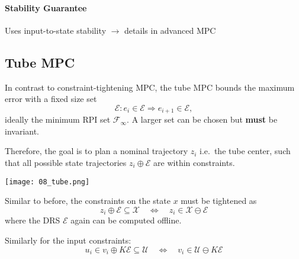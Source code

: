 \paragraph{Stability Guarantee}
Uses input-to-state stability $\rightarrow$ details in advanced MPC

\subsection{Tube MPC}
In contrast to constraint-tightening MPC, the tube MPC bounds the maximum error with a fixed size set
\begin{equation*}
    \mathcal{E}:e_i \in \mathcal{E} \Rightarrow e_{i+1}\in \mathcal{E},
\end{equation*}
ideally the minimum RPI set $\mathcal{F}_\infty$. A larger set can be chosen but \textbf{must} be invariant.

\newpar{}
Therefore, the goal is to plan a nominal trajectory $z_i$ i.e.\ the tube center, such that all possible state trajectories $z_i\oplus \mathcal{E}$ are within constraints.

\begin{center}
    \texttt{[image: 08\_tube.png]}
\end{center}

\newpar{}

Similar to before, the constraints on the state $x$ must be tightened as
\begin{equation*}
    z_i \oplus \mathcal{E} \subseteq \mathcal{X} \quad \Leftrightarrow \quad z_i \in \mathcal{X}\ominus \mathcal{E}
\end{equation*}
where the DRS $\mathcal{E}$ again can be computed offline.

\newpar{}
Similarly for the input constraints:
\begin{equation*}
    u_i \in v_i \oplus K \mathcal{E} \subseteq \mathcal{U}\quad \Leftrightarrow \quad v_i \in \mathcal{U} \ominus K\mathcal{E}
\end{equation*}


